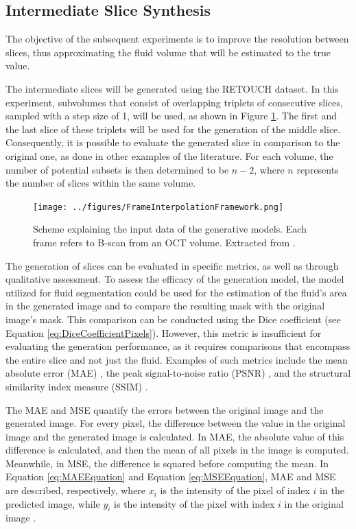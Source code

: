 \subsection{Intermediate Slice Synthesis}
The objective of the subsequent experiments is to improve the resolution between slices, thus approximating the fluid volume that will be estimated to the true value.
\par
The intermediate slices will be generated using the RETOUCH dataset. In this experiment, subvolumes that consist of overlapping triplets of consecutive slices, sampled with a step size of 1, will be used, as shown in Figure \ref{fig:FrameInterpolationFramework}. The first and the last slice of these triplets will be used for the generation of the middle slice. Consequently, it is possible to evaluate the generated slice in comparison to the original one, as done in other examples of the literature. For each volume, the number of potential subsets is then determined to be $n-2$, where $n$ represents the number of slices within the same volume.

\begin{figure}[!ht]
	\centering
	\texttt{[image: ../figures/FrameInterpolationFramework.png]}
	\caption{Scheme explaining the input data of the generative models. Each frame refers to B-scan from an OCT volume. Extracted from \textcite{Tran2020}.}
	\label{fig:FrameInterpolationFramework}
\end{figure}

The generation of slices can be evaluated in specific metrics, as well as through qualitative assessment. To assess the efficacy of the generation model, the model utilized for fluid segmentation could be used for the estimation of the fluid's area in the generated image and to compare the resulting mask with the original image's mask. This comparison can be conducted using the Dice coefficient \parencite{Lopez2023} (see Equation \ref{eq:DiceCoefficientPixels}). However, this metric is insufficient for evaluating the generation performance, as it requires comparisons that encompass the entire slice and not just the fluid. Examples of such metrics include the mean absolute error (MAE) \parencite{Lopez2023, Wu2022, Zhang2022}, the peak signal-to-noise ratio (PSNR) \parencite{Xia2021, YChen2018, Sanchez2018, Fang2022, Nimitha2024, Kudo2019, You2020, Zhang2024, Zhang2022}, and the structural similarity index measure (SSIM) \parencite{YChen2018, Sanchez2018, Fang2022, Nimitha2024, Kudo2019, You2020, Zhang2024, Zhang2022}.
\par
The MAE and MSE quantify the errors between the original image and the generated image. For every pixel, the difference between the value in the original image and the generated image is calculated. In MAE, the absolute value of this difference is calculated, and then the mean of all pixels in the image is computed. Meanwhile, in MSE, the difference is squared before computing the mean. In Equation \ref{eq:MAEEquation} and Equation \ref{eq:MSEEquation}, MAE and MSE are described, respectively, where $x_{i}$ is the intensity of the pixel of index $i$ in the predicted image, while $y_{i}$ is the intensity of the pixel with index $i$ in the original image \parencite{Sara2019, Rajkumar2016}.

